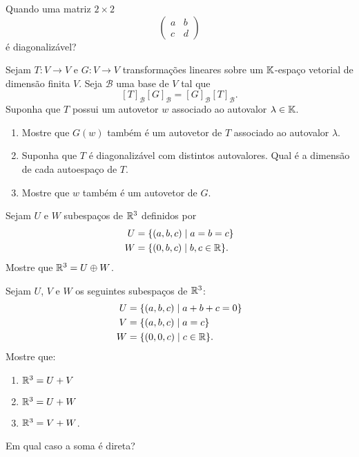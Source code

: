 \documentclass[12pt]{exam}
\begin{document}
\begin{exercicio}
  Quando uma matriz $2 \times 2$
  \[
    \begin{pmatrix}
      a & b\\c & d
    \end{pmatrix}
  \]
  \'e diagonaliz\'avel?
\end{exercicio}

\begin{exercicio}
  Sejam $T : V \to V$ e $G : V \to V$ transforma\c{c}\~oes lineares sobre um $\mathbb{K}$-espa\c{c}o vetorial de dimens\~ao finita $V$. Seja $\mathcal{B}$ uma base de $V$ tal que
  \[
    [T]_\mathcal{B}[G]_\mathcal{B} = [G]_\mathcal{B}[T]_\mathcal{B}.
  \]
  Suponha que $T$ possui um autovetor $w$ associado ao autovalor $\lambda \in \mathbb{K}$.
  \begin{enumerate}[label=({\alph*})]
    \item Mostre que $G(w)$ tamb\'em \'e um autovetor de $T$ associado ao autovalor $\lambda$.
    \item Suponha que $T$ \'e diagonaliz\'avel com distintos autovalores. Qual \'e a dimens\~ao de cada autoespa\c{c}o de $T$.
    \item Mostre que $w$ tamb\'em \'e um autovetor de $G$.
  \end{enumerate}
\end{exercicio}

\begin{exercicio}
  Sejam $U$ e $W$ subespa\c{c}os de $\mathbb{R}^3$ definidos por
  \begin{align*}
    U &= \{(a,b,c) \mid a = b = c\}\\
    W &= \{(0,b,c) \mid b, c \in \mathbb{R}\}.
  \end{align*}
  Mostre que $\mathbb{R}^3 = U \oplus W$.
\end{exercicio}

\begin{exercicio}
  Sejam $U$, $V$ e $W$ os seguintes subespa\c{c}os de $\mathbb{R}^3$:
  \begin{align*}
    U &= \{(a,b,c) \mid a + b + c = 0\}\\
    V &= \{(a,b,c) \mid a = c\}\\
    W &= \{(0,0,c) \mid c \in \mathbb{R}\}.
  \end{align*}
  Mostre que:
  \begin{enumerate}[label=({\alph*})]
    \item $\mathbb{R}^3 = U + V$
    \item $\mathbb{R}^3 = U + W$
    \item $\mathbb{R}^3 = V + W$.
  \end{enumerate}
  Em qual caso a soma \'e direta?
\end{exercicio}
\end{document}
